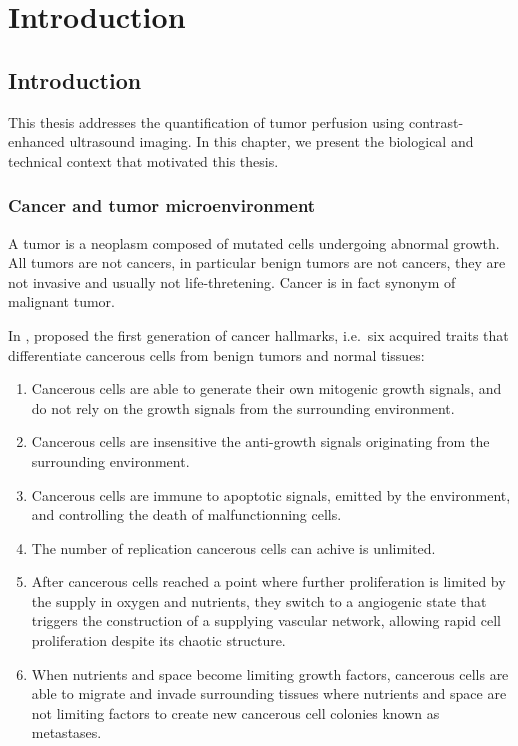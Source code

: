 \part*{Introduction}
\chapter{Introduction}\label{chapter:intro}
This thesis addresses the quantification of tumor perfusion using contrast-enhanced ultrasound imaging.
In this chapter, we present the biological and technical context that motivated this thesis.

\section{Cancer and tumor microenvironment}
\label{sec:IntroCancer}
A tumor is a neoplasm composed of mutated cells undergoing abnormal growth.
All tumors are not cancers, in particular benign tumors are not cancers, they are not invasive and usually not life-thretening.
Cancer is in fact synonym of malignant tumor.

In \citeyear{Hanahan:2000hx}, \citet{Hanahan:2000hx} proposed the first generation of cancer hallmarks, i.e.~six acquired traits that differentiate cancerous cells from benign tumors and normal tissues:
\begin{enumerate}
    \item Cancerous cells are able to generate their own mitogenic growth signals, and do not rely on the growth signals from the surrounding environment.
    \item Cancerous cells are insensitive the anti-growth signals originating from the surrounding environment.
    \item Cancerous cells are immune to apoptotic signals, emitted by the environment, and controlling the death of malfunctionning cells.
    \item The number of replication cancerous cells can achive is unlimited.
    \item After cancerous cells reached a point where further proliferation is limited by the supply in oxygen and nutrients, they switch to a angiogenic state that triggers the construction of a supplying vascular network, allowing rapid cell proliferation despite its chaotic structure.
    \item When nutrients and space become limiting growth factors, cancerous cells are able to migrate and invade surrounding tissues where nutrients and space are not limiting factors to create new cancerous cell colonies known as metastases.
\end{enumerate}

